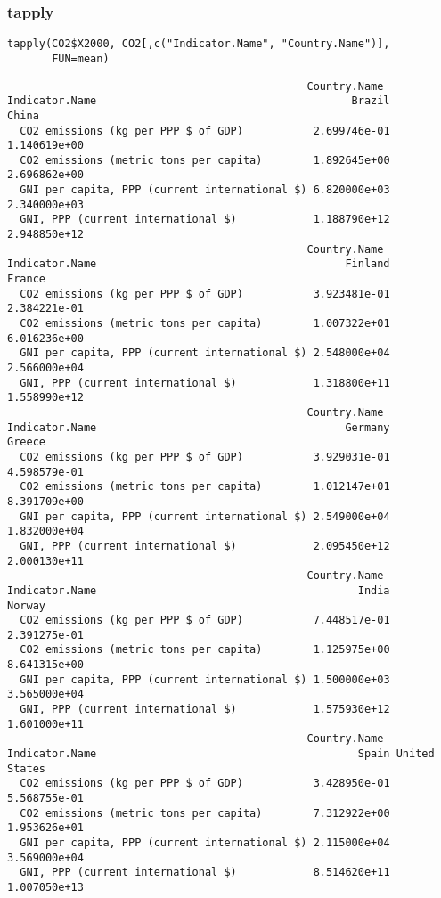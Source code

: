 \documentclass[xcolor={usenames,svgnames,dvipsnames}]{beamer}
\begin{document}
\begin{frame}[fragile]
\frametitle{tapply}
\label{sec-3-4}


\lstset{language=R}
\begin{lstlisting}
tapply(CO2$X2000, CO2[,c("Indicator.Name", "Country.Name")],
       FUN=mean)
\end{lstlisting}


\begin{verbatim}
                                               Country.Name
Indicator.Name                                        Brazil        China
  CO2 emissions (kg per PPP $ of GDP)           2.699746e-01 1.140619e+00
  CO2 emissions (metric tons per capita)        1.892645e+00 2.696862e+00
  GNI per capita, PPP (current international $) 6.820000e+03 2.340000e+03
  GNI, PPP (current international $)            1.188790e+12 2.948850e+12
                                               Country.Name
Indicator.Name                                       Finland       France
  CO2 emissions (kg per PPP $ of GDP)           3.923481e-01 2.384221e-01
  CO2 emissions (metric tons per capita)        1.007322e+01 6.016236e+00
  GNI per capita, PPP (current international $) 2.548000e+04 2.566000e+04
  GNI, PPP (current international $)            1.318800e+11 1.558990e+12
                                               Country.Name
Indicator.Name                                       Germany       Greece
  CO2 emissions (kg per PPP $ of GDP)           3.929031e-01 4.598579e-01
  CO2 emissions (metric tons per capita)        1.012147e+01 8.391709e+00
  GNI per capita, PPP (current international $) 2.549000e+04 1.832000e+04
  GNI, PPP (current international $)            2.095450e+12 2.000130e+11
                                               Country.Name
Indicator.Name                                         India       Norway
  CO2 emissions (kg per PPP $ of GDP)           7.448517e-01 2.391275e-01
  CO2 emissions (metric tons per capita)        1.125975e+00 8.641315e+00
  GNI per capita, PPP (current international $) 1.500000e+03 3.565000e+04
  GNI, PPP (current international $)            1.575930e+12 1.601000e+11
                                               Country.Name
Indicator.Name                                         Spain United States
  CO2 emissions (kg per PPP $ of GDP)           3.428950e-01  5.568755e-01
  CO2 emissions (metric tons per capita)        7.312922e+00  1.953626e+01
  GNI per capita, PPP (current international $) 2.115000e+04  3.569000e+04
  GNI, PPP (current international $)            8.514620e+11  1.007050e+13
\end{verbatim}
\end{frame}
\end{document}
